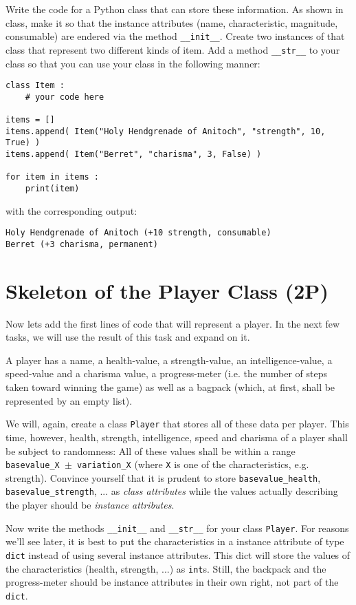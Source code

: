 \documentclass[
	english,
	fontsize=10pt,
	parskip=half,
	titlepage=true,
	DIV=12
]{scrartcl}
\newcommand*{\inPy}[1]{\texttt{#1}}
\newcommand*{\ie}{i.\;e. }
\newcommand*{\eg}{e.\;g. }
\begin{document}
Write the code for a Python class that can store these information. As shown in class, make it so that the instance attributes (name, characteristic, magnitude, consumable) are endered via the method \inPy{__init__}. Create two instances of that class that represent two different kinds of item. Add a method \inPy{__str__} to your class so that you can use your class in the following manner:

\begin{verbatim}
class Item :
    # your code here

items = []
items.append( Item("Holy Hendgrenade of Anitoch", "strength", 10, True) )
items.append( Item("Berret", "charisma", 3, False) )

for item in items :
    print(item)
\end{verbatim}

with the corresponding output:
\begin{verbatim}
Holy Hendgrenade of Anitoch (+10 strength, consumable)
Berret (+3 charisma, permanent)
\end{verbatim}


\section{Skeleton of the Player Class (2\;P)}
Now lets add the first lines of code that will represent a player. In the next few tasks, we will use the result of this task and expand on it.

A player has a name, a health-value, a strength-value, an intelligence-value, a speed-value and a charisma value, a progress-meter (\ie the number of steps taken toward winning the game) as well as a bagpack (which, at first, shall be represented by an empty list).

We will, again, create a class \texttt{Player} that stores all of these data per player. This time, however, health, strength, intelligence, speed and charisma of a player shall be subject to randomness: All of these values shall be within a range \texttt{basevalue\_X $\pm$ variation\_X} (where \texttt{X} is one of the characteristics, \eg strength). Convince yourself that it is prudent to store \texttt{basevalue\_health}, \texttt{basevalue\_strength}, ... as \emph{class attributes} while the values actually describing the player should be \emph{instance attributes}.

Now write the methods \inPy{__init__} and \inPy{__str__} for your class \texttt{Player}. For reasons we'll see later, it is best to put the characteristics in a instance attribute of type \inPy{dict} instead of using several instance attributes. This dict will store the values of the characteristics (health, strength, ...) as \inPy{int}s. Still, the backpack and the progress-meter should be instance attributes in their own right, not part of the \inPy{dict}.
\end{document}
